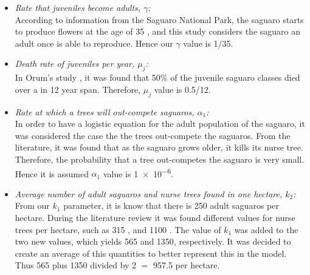 \documentclass[a4paper]{article}
\begin{document}
\begin{itemize}
\item \textit{Rate that juveniles become adults, $\gamma$:}\\
According to information from the Saguaro National Park, the saguaro starts to produce flowers at the age of 35 \cite{SaguaroGrowth}, and this study considers the saguaro an adult once is able to reproduce. Hence our $\gamma$ value is 1/35.

\item \textit{Death rate of juveniles per year, $\mu_j$:}\\
In Orum's study \cite{Orum}, it was found that 50\% of the juvenile saguaro classes died over a in 12 year span. Therefore, $\mu_j$ value is 0.5/12.

\item \textit{Rate at which a trees will out-compete saguaros, $\alpha_1$:}\\
In order to have a logistic equation for the adult population of the saguaro, it was considered the case the the trees out-compete the saguaros. From the literature, it was found that as the saguaro grows older, it kills its nurse tree. Therefore, the probability that a tree out-competes the saguaro is very small. Hence it is assumed $\alpha_1$ value is \num{1e-6}.

\item \textit{Average number of adult saguaros and nurse trees found in one hectare, $k_2$:}\\
From our $k_1$ parameter, it is know that there is 250 adult saguaros per hectare. During the literature review it was found different values for nurse trees per hectare, such as 315 \cite{A-SdesertMuseum}, and 1100 \cite{paloVerdeFacts}. The value of $k_1$ was added to the two new values, which yields 565 and 1350, respectively. It was decided to create an average of this quantities to better represent this in the model. Thus 565 plus 1350 divided by 2 $=$ 957.5 per hectare.


\end{itemize}
\end{document}
